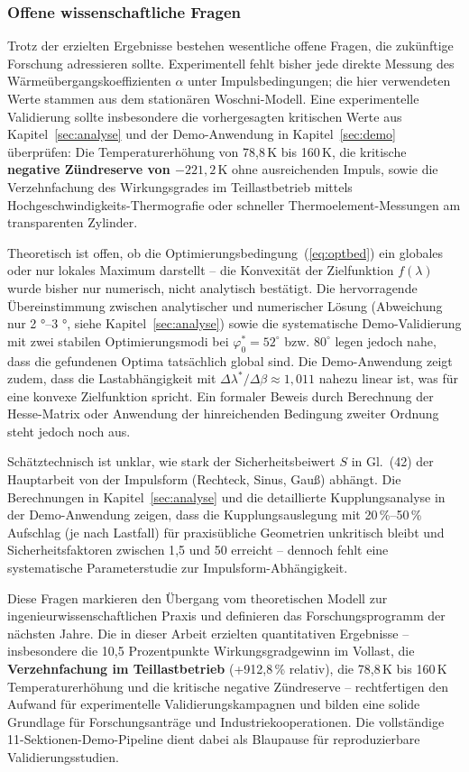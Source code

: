 ﻿\documentclass[a4paper,12pt]{article}
\begin{document}
\subsubsection{Offene wissenschaftliche Fragen}

Trotz der erzielten Ergebnisse bestehen wesentliche offene Fragen,
die zukünftige Forschung adressieren sollte. Experimentell
fehlt bisher jede direkte Messung des Wärmeübergangskoeffizienten
$\alpha$ unter Impulsbedingungen; die hier verwendeten Werte
stammen aus dem stationären Woschni-Modell. Eine experimentelle
Validierung sollte insbesondere die vorhergesagten kritischen Werte
aus Kapitel~\ref{sec:analyse} und der Demo-Anwendung in
Kapitel~\ref{sec:demo} überprüfen: Die Temperaturerhöhung von
78{,}8\,K bis 160\,K, die kritische \textbf{negative Zündreserve von
$-221{,}2\,\text{K}$} ohne ausreichenden Impuls, sowie die
Verzehnfachung des Wirkungsgrades im Teillastbetrieb mittels
Hochgeschwindigkeits-Thermografie oder schneller Thermoelement-Messungen
am transparenten Zylinder.

Theoretisch ist offen, ob die Optimierungsbedingung~(\ref{eq:optbed}) ein
globales oder nur lokales Maximum darstellt -- die Konvexität
der Zielfunktion $f(\lambda)$ wurde bisher nur numerisch, nicht
analytisch bestätigt. Die hervorragende Übereinstimmung zwischen
analytischer und numerischer Lösung (Abweichung nur 2 °--3 °,
siehe Kapitel~\ref{sec:analyse}) sowie die systematische Demo-Validierung
mit zwei stabilen Optimierungsmodi bei $\varphi_0^* = 52^\circ$ bzw.
$80^\circ$ legen jedoch nahe, dass die gefundenen Optima tatsächlich
global sind. Die Demo-Anwendung zeigt zudem, dass die Lastabhängigkeit
mit $\Delta\lambda^*/\Delta\beta \approx 1{,}011$ nahezu linear ist,
was für eine konvexe Zielfunktion spricht. Ein formaler Beweis durch
Berechnung der Hesse-Matrix oder Anwendung der hinreichenden Bedingung
zweiter Ordnung steht jedoch noch aus.

Schätztechnisch ist unklar, wie stark der Sicherheitsbeiwert $S$ in
Gl.~(42) der Hauptarbeit von der Impulsform (Rechteck, Sinus, Gauß) abhängt.
Die Berechnungen in Kapitel~\ref{sec:analyse} und die detaillierte
Kupplungsanalyse in der Demo-Anwendung zeigen, dass die
Kupplungsauslegung mit 20\,\%--50\,\% Aufschlag (je nach Lastfall)
für praxisübliche Geometrien unkritisch bleibt und Sicherheitsfaktoren
zwischen 1{,}5 und 50 erreicht -- dennoch fehlt eine systematische
Parameterstudie zur Impulsform-Abhängigkeit.

Diese Fragen markieren den Übergang vom theoretischen Modell
zur ingenieurwissenschaftlichen Praxis und definieren das
Forschungsprogramm der nächsten Jahre. Die in dieser Arbeit
erzielten quantitativen Ergebnisse -- insbesondere die 10{,}5 Prozentpunkte
Wirkungsgradgewinn im Vollast, die \textbf{Verzehnfachung im Teillastbetrieb}
(+912{,}8\,\% relativ), die 78{,}8\,K bis 160\,K Temperaturerhöhung und
die kritische negative Zündreserve -- rechtfertigen den Aufwand für
experimentelle Validierungskampagnen und bilden eine solide Grundlage für
Forschungsanträge und Industriekooperationen. Die vollständige
11-Sektionen-Demo-Pipeline dient dabei als Blaupause für
reproduzierbare Validierungsstudien.
\end{document}
